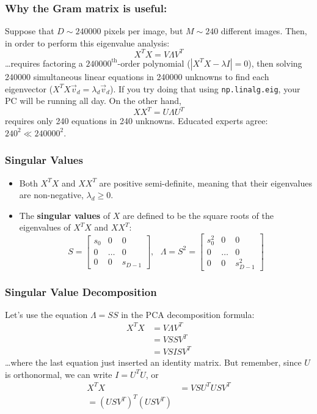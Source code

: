 \documentclass{beamer}
\begin{document}
\begin{frame}
  \frametitle{Why the Gram matrix is useful:}

  Suppose that $D\sim 240000$ pixels per image, but $M\sim
  240$ different images.  Then, in order to perform this eigenvalue
  analysis:
  \[
  X^TX = V\Lambda V^T
  \]
  \ldots requires factoring a $240000^{\textrm{th}}$-order polynomial
  ($|X^TX-\lambda I|=0$), then solving 240000 simultaneous linear
  equations in 240000 unknowns to find each eigenvector
  ($X^TX\vec{v}_d=\lambda_d\vec{v}_d$).  If you try doing that using
  {\tt np.linalg.eig}, your PC will be running all day.  On the other
  hand,
  \[
  XX^T=U\Lambda U^T
  \]
  requires only 240 equations in 240 unknowns.  Educated experts
  agree: $240^2 \ll 240000^2$.
\end{frame}
  
\begin{frame}
  \frametitle{Singular Values}
  \begin{itemize}
  \item Both $X^TX$ and $XX^T$ are positive semi-definite, meaning
    that their eigenvalues are non-negative, $\lambda_d\ge 0$.
  \item The {\bf singular values} of $X$ are defined to be the
    square roots of the eigenvalues of $X^TX$ and $XX^T$:
    \[
    S=\left[\begin{array}{ccc}s_0&0&0\\0&\ldots&0\\0&0&s_{D-1}\end{array}\right],~~~
    \Lambda=S^2=\left[\begin{array}{ccc}s_0^2&0&0\\0&\ldots&0\\0&0&s_{D-1}^2\end{array}\right]
    \]
  \end{itemize}
\end{frame}

\begin{frame}
  \frametitle{Singular Value Decomposition}

  Let's use the equation $\Lambda=SS$ in the PCA decomposition
  formula:
  \begin{align*}
    X^TX&= V\Lambda V^T\\
    &= VSSV^T\\
    &= VSISV^T
  \end{align*}
  \ldots where the last equation just inserted an identity matrix.  But remember, since $U$ is
  orthonormal, we can write $I=U^TU$, or
  \begin{align*}
    X^TX &= VSU^TUSV^T\\
    = (USV^T)^T(USV^T)
  \end{align*}
\end{frame}
\end{document}
